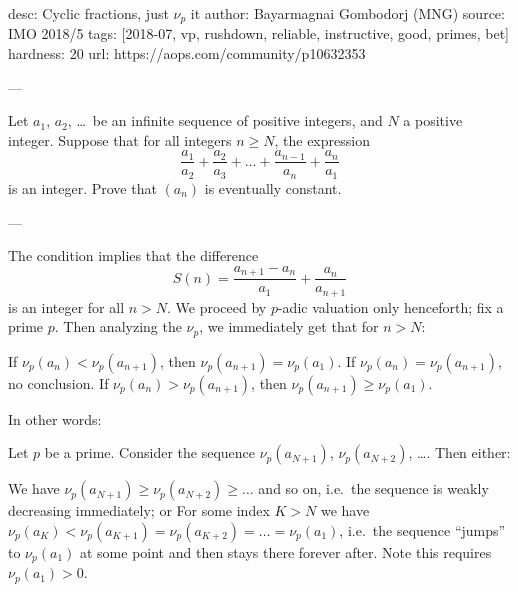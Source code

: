 desc: Cyclic fractions, just $\nu_p$ it
author: Bayarmagnai Gombodorj (MNG)
source: IMO 2018/5
tags: [2018-07, vp, rushdown, reliable, instructive, good, primes, bet]
hardness: 20
url: https://aops.com/community/p10632353

---

Let $a_1$, $a_2$, \dots\ be an infinite sequence of positive integers,
and $N$ a positive integer.
Suppose that for all integers $n \ge N$, the expression
\[ \frac{a_1}{a_2} + \frac{a_2}{a_3} + \dots
  + \frac{a_{n-1}}{a_n} + \frac{a_n}{a_1} \]
is an integer.
Prove that $(a_n)$ is eventually constant.

---

The condition implies that the difference
\[ S(n) = \frac{a_{n+1} - a_n}{a_1} + \frac{a_n}{a_{n+1}} \]
is an integer for all $n > N$.
We proceed by $p$-adic valuation only henceforth;
fix a prime $p$.
Then analyzing the $\nu_p$, we immediately get that for $n > N$:
\begin{itemize}
\ii If $\nu_p(a_n) < \nu_p(a_{n+1})$, then $\nu_p(a_{n+1}) = \nu_p(a_1)$.
\ii If $\nu_p(a_n) = \nu_p(a_{n+1})$, no conclusion.
\ii If $\nu_p(a_n) > \nu_p(a_{n+1})$,
then $\nu_p(a_{n+1}) \ge \nu_p(a_1)$.
\end{itemize}
In other words:
\begin{claim*}
Let $p$ be a prime.  Consider the sequence
$\nu_p(a_{N+1})$, $\nu_p(a_{N+2})$, \dots.
Then either:
\begin{itemize}
  \ii We have $\nu_p(a_{N+1}) \ge \nu_p(a_{N+2}) \ge \dots$
  and so on, i.e.\ the sequence is weakly decreasing immediately; or
  \ii For some index $K > N$ we have
  $\nu_p(a_K) < \nu_p(a_{K+1}) = \nu_p(a_{K+2}) = \dots = \nu_p(a_1)$,
  i.e.\ the sequence ``jumps'' to $\nu_p(a_1)$
  at some point and then stays there forever after.
  Note this requires $\nu_p(a_1) > 0$.
\end{itemize}
\end{claim*}

